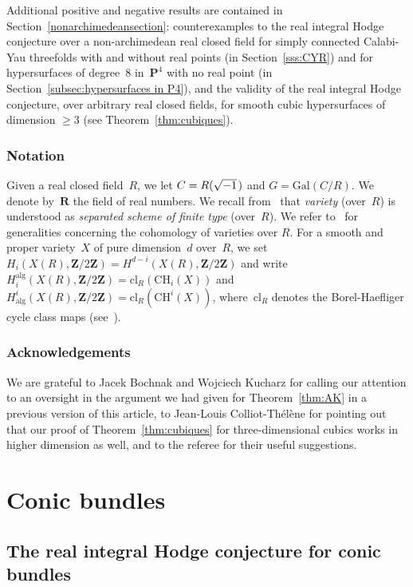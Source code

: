 \documentclass[JEP,XML,SOM,Unicode]{cedram}
\theoremstyle{plain}
\theoremstyle{definition}
\numberwithin{equation}{section}
\newcommand{\alg}{{\mathrm{alg}}}
\newcommand{\cl}{{\mathrm{cl}}}
\renewcommand{\P}{{\mathbf P}}
\newcommand{\R}{{\mathbf R}}
\newcommand{\Z}{{\mathbf Z}}
\newcommand{\CH}{\mathrm{CH}}
\newcommand{\Gal}{\mathrm{Gal}}
\begin{document}
{Additional positive and negative results are contained in Section~\ref{nonarchimedeansection}:
counterexamples to the real integral Hodge conjecture over a non-archimedean real closed field
for simply connected Calabi-Yau threefolds with and without real points (in Section~\ref{sss:CYR})
and for hypersurfaces of degree~$8$ in~$\P^4$ with no real point (in Section~\ref{subsec:hypersurfaces in P4}), and the validity of the real integral Hodge conjecture,
over arbitrary real closed fields, for smooth cubic hypersurfaces of dimension $\geq 3$ (see Theorem~\ref{thm:cubiques}).

\subsubsection*{Notation}
Given a real closed field~$R$, we let $C=R(\sqrt{-1}\mkern2mu)$
and $G=\Gal(C/R)$.
We denote by~$\R$ the field of real numbers.
We recall from~\cite{BW1}
that \emph{variety} (over~$R$)
is understood as \emph{separated scheme of finite type} (over~$R$).
We refer to~\cite[\textsection\ref*{BW1-sec:cohomology}]{BW1} for generalities concerning the cohomology of varieties over $R$.
For a smooth and proper variety~$X$ of pure dimension~$d$ over~$R$,
we set $H_i(X(R),\Z/2\Z)=H^{d-i}(X(R),\Z/2\Z)$
and write $H_i^\alg(X(R),\Z/2\Z)=\cl_R(\CH_i(X))$
and $H^i_\alg(X(R),\Z/2\Z)=\cl_R(\CH^i(X))$,
where~$\cl_R$ denotes the Borel-Haefliger cycle class maps
(see~\cite[\textsection\ref*{BW1-subsubsec:borel-haefliger}]{BW1}).
}

\subsubsection*{Acknowledgements}
We are grateful to Jacek Bochnak and Wojciech Kucharz
for calling our attention to an oversight in the argument
we had given for Theorem~\ref{thm:AK} in a previous version of this article, to Jean-Louis Colliot-Thélène for pointing out that our proof of Theorem~\ref{thm:cubiques} for three-dimensional cubics works in higher dimension as well, and to the referee for their useful suggestions.

\section{Conic bundles}
\label{sec:conicbundles}

\subsection{The real integral Hodge conjecture for conic bundles}
\end{document}
